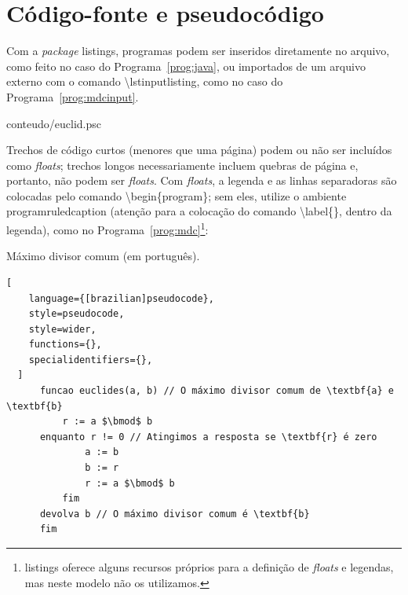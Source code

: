 
\chapter{Código-fonte e pseudocódigo}
\label{ap:pseudocode}

Com a \textit{package} \textsf{listings}, programas podem ser inseridos
diretamente no arquivo, como feito no caso do Programa~\ref{prog:java},
ou importados de um arquivo externo com o comando
\textsf{\textbackslash{}lstinputlisting}, como no caso
do Programa~\ref{prog:mdcinput}.

\begin{program}
  
  {conteudo/euclid.psc}

  \caption{Máximo divisor comum (arquivo importado).\label{prog:mdcinput}}
\end{program}

Trechos de código curtos (menores que uma página) podem ou não ser
incluídos como \textit{floats}; trechos longos necessariamente incluem
quebras de página e, portanto, não podem ser \textit{floats}. Com
\textit{floats}, a legenda e as linhas separadoras são colocadas pelo
comando \textsf{\textbackslash{}begin\{program\}}; sem eles, utilize o
ambiente \textsf{programruledcaption} (atenção para a colocação do
comando \textsf{\textbackslash{}label\{\}}, dentro da legenda), como
no Programa~\ref{prog:mdc}\footnote{\textsf{listings} oferece alguns
recursos próprios para a definição de \textit{floats} e legendas, mas
neste modelo não os utilizamos.}:

\begin{programruledcaption}{Máximo divisor comum (em português).\label{prog:mdc}}
  \begin{lstlisting}[
    language={[brazilian]pseudocode},
    style=pseudocode,
    style=wider,
    functions={},
    specialidentifiers={},
  ]
      funcao euclides(a, b) // O máximo divisor comum de \textbf{a} e \textbf{b}
          r := a $\bmod$ b
	  enquanto r != 0 // Atingimos a resposta se \textbf{r} é zero
              a := b
              b := r
              r := a $\bmod$ b
          fim
	  devolva b // O máximo divisor comum é \textbf{b}
      fim
  \end{lstlisting}
\end{programruledcaption}


